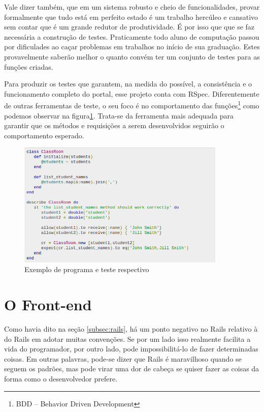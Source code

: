 Vale dizer também, que em um sistema robusto e cheio de funcionalidades, provar
formalmente que tudo está em perfeito estado é um trabalho hercúleo e cansativo
sem contar que é um grande redutor de produtividade. É por isso que que se faz
necessária a construção de testes. Praticamente todo aluno de computação passou
por dificulades ao caçar problemas em trabalhos no início de sua graduação.
Estes provavelmente saberão melhor o quanto convém ter um conjunto de testes
para as funções criadas.

Para produzir os testes que garantem, na medida do possível, a consistência e o
funcionamento completo do portal, esse projeto conta com RSpec. Diferentemente de
outras ferramentas de teste, o seu foco é no comportamento das funções\footnote{
BDD -- Behavior Driven Development} como podemos observar na figura\ref{fig:rspec}.
Trata-se da ferramenta mais adequada para garantir que os métodos e requisições a
serem desenvolvidos seguirão o comportamento esperado.

\begin{figure}[htb]
    \centering
    \includegraphics[width=10cm]{figuras/rspec}
    \caption{\label{fig:rspec} Exemplo de programa e teste respectivo}
\end{figure}

\section{O Front-end}
\label{sec:front-end}

Como havia dito na seção \ref{subsec:rails}, há um ponto negativo no Rails relativo à
 do Rails em adotar muitas convenções. Se por um lado isso realmente facilita
a vida do programador, por outro lado, pode impossibilitá-lo de fazer determinadas coisas.
Em outras palavras, pode-se dizer que Rails é maravilhoso quando se seguem os padrões, mas
pode virar uma dor de cabeça se quiser fazer as coisas da forma como o desenvolvedor
prefere.

